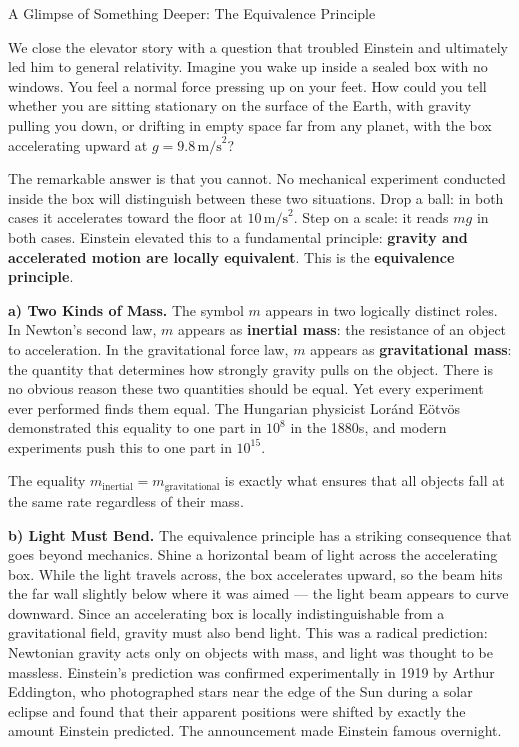 \begin{supplementary}{A Glimpse of Something Deeper: The Equivalence Principle}

We close the elevator story with a question that troubled Einstein and ultimately led him to general relativity.
Imagine you wake up inside a sealed box with no windows. You feel a normal force pressing
up on your feet. How could you tell whether you are sitting stationary on the surface of the
Earth, with gravity pulling you down, or drifting in empty space far from any planet, with
the box accelerating upward at $g=9.8\,\text{m/s}^2$?

The remarkable answer is that you cannot. No mechanical experiment conducted inside the
box will distinguish between these two situations. Drop a ball: in both cases it accelerates
toward the floor at $10\,\text{m/s}^2$. Step on a scale: it reads $mg$ in both cases. Einstein
elevated this to a fundamental principle: \textbf{gravity and accelerated motion are locally
equivalent}. This is the \textbf{equivalence principle}.

\textbf{a) Two Kinds of Mass.} The symbol $m$ appears in two logically distinct roles.
In Newton's second law, $m$ appears as \textbf{inertial mass}: the resistance of an object to
acceleration. In the gravitational force law, $m$ appears as \textbf{gravitational mass}: the
quantity that determines how strongly gravity pulls on the object. There is no obvious reason
these two quantities should be equal. Yet every experiment ever performed finds them equal.
The Hungarian physicist Lor\'and E\"otv\"os demonstrated this equality to one part in $10^8$
in the 1880s, and modern experiments push this to one part in $10^{15}$.

The equality $m_\text{inertial}=m_\text{gravitational}$ is exactly what ensures that all
objects fall at the same rate regardless of their mass.

\textbf{b) Light Must Bend.} The equivalence principle has a striking consequence that
goes beyond mechanics. Shine a horizontal beam of light across the accelerating box. While
the light travels across, the box accelerates upward, so the beam hits the far wall slightly
below where it was aimed --- the light beam appears to curve downward. Since an accelerating
box is locally indistinguishable from a gravitational field, gravity must also bend light. This
was a radical prediction: Newtonian gravity acts only on objects with mass, and light was
thought to be massless. Einstein's prediction was confirmed experimentally in 1919 by Arthur
Eddington, who photographed stars near the edge of the Sun during a solar eclipse and found
that their apparent positions were shifted by exactly the amount Einstein predicted. The
announcement made Einstein famous overnight.


\end{supplementary}
